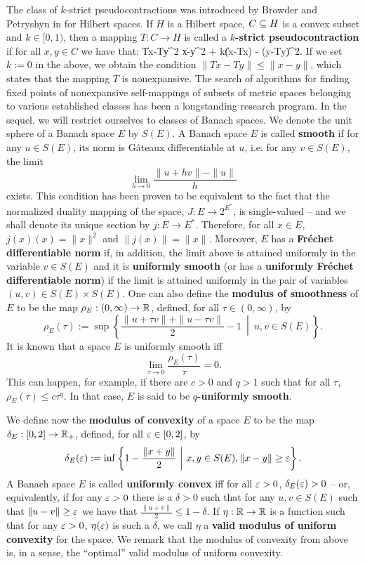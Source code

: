 \documentclass{article}
\begin{document}
The class of $k$-strict pseudocontractions was introduced by Browder and Petryshyn in \cite{BroPet67} for Hilbert spaces. If $H$ is a Hilbert space, $C \subseteq H$ is a convex subset and $k \in [0,1)$, then a mapping $T: C \to H$ is called a {\bf $k$-strict pseudocontraction} if for all $x,y \in C$ we have that:
\beq
\|Tx-Ty\|^2 \leq \|x-y\|^2 + k\|(x-Tx) - (y-Ty)\|^2.\label{k-ps}
\eeq
If we set $k:=0$ in the above, we obtain the condition $\|Tx-Ty\| \leq \|x-y\|$, which states that the mapping $T$ is nonexpansive. The search of algorithms for finding fixed points of nonexpansive self-mappings of subsets of metric spaces belonging to various established classes has been a longstanding research program. In the sequel, we will restrict ourselves to classes of Banach spaces. We denote the unit sphere of a Banach space $E$ by $S(E)$. A Banach space $E$ is called {\bf smooth} if for any $u \in S(E)$, its norm is Gâteaux differentiable at $u$, i.e. for any $v \in S(E)$, the limit
$$\lim_{h \to 0} \frac{\|u+hv\|-\|u\|}{h}$$
exists. This condition has been proven to be equivalent to the fact that the normalized duality mapping of the space, $J: E \to 2^{E^*}$, is single-valued -- and we shall denote its unique section by $j: E \to E^*$. Therefore, for all $x \in E$, $j(x)(x)=\|x\|^2$ and $\|j(x)\|=\|x\|$. Moreover, $E$ has a {\bf Fréchet differentiable norm} if, in addition, the limit above is attained uniformly in the variable $v \in S(E)$ and it is {\bf uniformly smooth} (or has a {\bf uniformly Fréchet differentiable norm}) if the limit is attained uniformly in the pair of variables $(u,v) \in S(E) \times S(E)$. One can also define the {\bf modulus of smoothness} of $E$ to be the map $\rho_E: (0, \infty) \to {\mathbb R}$, defined, for all $\tau \in (0, \infty)$, by
$$\rho_E(\tau):= \sup\left\{\frac{\|u+\tau v\|+\|u-\tau v\|}{2} -1\ \middle|\ u,v\in S(E) \right\}.$$
It is known that a space $E$ is uniformly smooth iff 
$$ \lim_{\tau\to 0}\frac{\rho_E(\tau)}{\tau}=0.$$
This can happen, for example, if there are $c>0$ and $q>1$ such that for all $\tau$, $\rho_E(\tau) \leq c \tau^q$. In that case, $E$ is said to be {\bf $q$-uniformly smooth}.

We define now the {\bf modulus of convexity} of a space $E$ to be the map $\delta_E: [0,2] \to {\mathbb R}_+$, defined, for all $\varepsilon \in [0,2]$, by
$$\delta_E(\varepsilon):= \inf\left\{1-\frac{\|x+y\|}{2}\ \middle|\ x,y\in S(E), \|x-y\|\geq\varepsilon \right\}.$$
A Banach space $E$ is called {\bf uniformly convex} iff for all $\varepsilon>0$, $\delta_E(\varepsilon)>0$ -- or, equivalently, if for any $\varepsilon >0$ there is a $\delta>0$ such that for any $u,v \in S(E)$ such that $\|u-v\|\geq\varepsilon$ we have that $\frac{\|u+v\|}{2}\leq 1-\delta$. If $\eta : {\mathbb R} \to {\mathbb R}$ is a function such that for any $\varepsilon>0$, $\eta(\varepsilon)$ is such a $\delta$, we call $\eta$ a {\bf valid modulus of uniform convexity} for the space. We remark that the modulus of convexity from above is, in a sense, the ``optimal'' valid modulus of uniform convexity.
\end{document}
